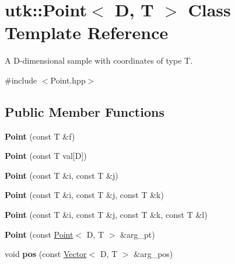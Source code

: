 \hypertarget{classutk_1_1Point}{\section{utk\-:\-:Point$<$ D, T $>$ Class Template Reference}
\label{classutk_1_1Point}
}


A D-\/dimensional sample with coordinates of type T.  




{\ttfamily \#include $<$Point.\-hpp$>$}

\subsection*{Public Member Functions}
\begin{DoxyCompactItemize}
\item 
\hypertarget{classutk_1_1Point_a009dae3aa21d34d2a553ca15f12ee742}{{\bfseries Point} (const T \&f)}\label{classutk_1_1Point_a009dae3aa21d34d2a553ca15f12ee742}

\item 
\hypertarget{classutk_1_1Point_a027e496c55b33346694b8eb3d253febc}{{\bfseries Point} (const T val\mbox{[}D\mbox{]})}\label{classutk_1_1Point_a027e496c55b33346694b8eb3d253febc}

\item 
\hypertarget{classutk_1_1Point_ae4d29aeba9f6adde7b8ca2153eee4354}{{\bfseries Point} (const T \&i, const T \&j)}\label{classutk_1_1Point_ae4d29aeba9f6adde7b8ca2153eee4354}

\item 
\hypertarget{classutk_1_1Point_a09a47085bfa534f5e955bd91421608ac}{{\bfseries Point} (const T \&i, const T \&j, const T \&k)}\label{classutk_1_1Point_a09a47085bfa534f5e955bd91421608ac}

\item 
\hypertarget{classutk_1_1Point_ada888533453661263b81bf4077ef3d82}{{\bfseries Point} (const T \&i, const T \&j, const T \&k, const T \&l)}\label{classutk_1_1Point_ada888533453661263b81bf4077ef3d82}

\item 
\hypertarget{classutk_1_1Point_aac498658f758e4681e7c8aabc720f456}{{\bfseries Point} (const \hyperlink{classutk_1_1Point}{Point}$<$ D, T $>$ \&arg\-\_\-pt)}\label{classutk_1_1Point_aac498658f758e4681e7c8aabc720f456}

\item 
\hypertarget{classutk_1_1Point_a21dfa1b8720040d2c1fd5afb33a23579}{void {\bfseries pos} (const \hyperlink{classutk_1_1Vector}{Vector}$<$ D, T $>$ \&arg\-\_\-pos)}\label{classutk_1_1Point_a21dfa1b8720040d2c1fd5afb33a23579}


\end{DoxyCompactItemize}
